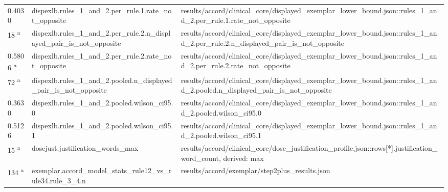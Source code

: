 \begin{longtable}{@{}p{0.7in}p{1.9in}p{2.6in}@{}}
0.4030 & dispexlb.\allowbreak{}rules\_1\_and\_2.\allowbreak{}per\_rule.\allowbreak{}1.\allowbreak{}rate\_not\_opposite & results/\allowbreak{}accord/\allowbreak{}clinical\_core/\allowbreak{}displayed\_exemplar\_lower\_bound.\allowbreak{}json::rules\_1\_and\_2.\allowbreak{}per\_rule.\allowbreak{}1.\allowbreak{}rate\_not\_opposite\\
18 \textsuperscript{a} & dispexlb.\allowbreak{}rules\_1\_and\_2.\allowbreak{}per\_rule.\allowbreak{}2.\allowbreak{}n\_displayed\_pair\_is\_not\_opposite & results/\allowbreak{}accord/\allowbreak{}clinical\_core/\allowbreak{}displayed\_exemplar\_lower\_bound.\allowbreak{}json::rules\_1\_and\_2.\allowbreak{}per\_rule.\allowbreak{}2.\allowbreak{}n\_displayed\_pair\_is\_not\_opposite\\
0.5806 \textsuperscript{a} & dispexlb.\allowbreak{}rules\_1\_and\_2.\allowbreak{}per\_rule.\allowbreak{}2.\allowbreak{}rate\_not\_opposite & results/\allowbreak{}accord/\allowbreak{}clinical\_core/\allowbreak{}displayed\_exemplar\_lower\_bound.\allowbreak{}json::rules\_1\_and\_2.\allowbreak{}per\_rule.\allowbreak{}2.\allowbreak{}rate\_not\_opposite\\
72 \textsuperscript{a} & dispexlb.\allowbreak{}rules\_1\_and\_2.\allowbreak{}pooled.\allowbreak{}n\_displayed\_pair\_is\_not\_opposite & results/\allowbreak{}accord/\allowbreak{}clinical\_core/\allowbreak{}displayed\_exemplar\_lower\_bound.\allowbreak{}json::rules\_1\_and\_2.\allowbreak{}pooled.\allowbreak{}n\_displayed\_pair\_is\_not\_opposite\\
0.3630 & dispexlb.\allowbreak{}rules\_1\_and\_2.\allowbreak{}pooled.\allowbreak{}wilson\_ci95.\allowbreak{}0 & results/\allowbreak{}accord/\allowbreak{}clinical\_core/\allowbreak{}displayed\_exemplar\_lower\_bound.\allowbreak{}json::rules\_1\_and\_2.\allowbreak{}pooled.\allowbreak{}wilson\_ci95.\allowbreak{}0\\
0.5126 & dispexlb.\allowbreak{}rules\_1\_and\_2.\allowbreak{}pooled.\allowbreak{}wilson\_ci95.\allowbreak{}1 & results/\allowbreak{}accord/\allowbreak{}clinical\_core/\allowbreak{}displayed\_exemplar\_lower\_bound.\allowbreak{}json::rules\_1\_and\_2.\allowbreak{}pooled.\allowbreak{}wilson\_ci95.\allowbreak{}1\\
15 \textsuperscript{a} & dosejust.\allowbreak{}justification\_words\_max & results/\allowbreak{}accord/\allowbreak{}clinical\_core/\allowbreak{}dose\_justification\_profile.\allowbreak{}json::rows[*].\allowbreak{}justification\_word\_count, derived: max\\
134 \textsuperscript{a} & exemplar.\allowbreak{}accord\_model\_stats\_rule12\_vs\_rule34.\allowbreak{}rule\_3\_4.\allowbreak{}n & results/\allowbreak{}accord/\allowbreak{}exemplar/\allowbreak{}step2plus\_results.\allowbreak{}json\\

\end{longtable}
